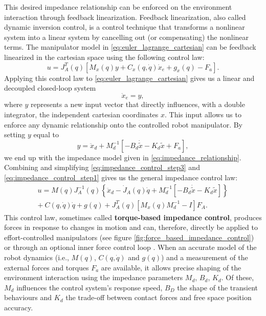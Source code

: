 This desired impedance relationship can be enforced on the environment interaction through feedback linearization. Feedback linearization, also called dynamic inversion control, is a control technique that transforms a nonlinear system into a linear system by cancelling out (or compensating) the nonlinear terms. The manipulator model in \eqref{eq:euler_lagrange_cartesian} can be feedback linearized in the cartesian space using the following control law:
\begin{equation} \label{eq:impedance_control_step1}
  u = J_ A^T \left( q \right)\left[ M_x \left( q \right) y + C_x \left( q ,\dot{ q }\right)\dot{ x }_e + g_x \left( q \right)- F_a \right].
\end{equation}
Applying this control law to \eqref{eq:euler_lagrange_cartesian} gives us a linear and decoupled closed-loop system
\begin{equation} \label{eq:impedance_control_step2}
  \ddot{ x }_e = y,
\end{equation}
where $y$ represents a new input vector that directly influences, with a double integrator, the independent cartesian coordinates $x$. This input allows us to enforce any dynamic relationship onto the controlled robot manipulator. By setting $y$ equal to
\begin{equation} \label{eq:impedance_control_step3}
  y = \ddot{ x }_d + M_ d^{- 1 }\left[- B_d \dot{\widetilde{ x }}- K_d \widetilde{ x }+ F_a \right],
\end{equation}
we end up with the impedance model given in \eqref{eq:impedance_relationship}. Combining and simplifying \eqref{eq:impedance_control_step3} and \eqref{eq:impedance_control_step1} gives us the general impedance control law:
\begin{equation}
  \begin{split}
    u = M \left( q \right) J_ A^{- 1 }\left( q \right)\left\{\ddot{ x }_d - \dot{ J }_A \left( q \right)\dot{ q } +  M_ d^{- 1 }\left[- B_d \dot{\widetilde{ x }} - K_d \widetilde{ x }\right]\right\} \\
    +\ C \left( q ,\dot{ q }\right)\dot{ q } + g \left( q \right) + J_ A^T \left( q \right)\left[ M_x \left( q \right) M_ d^{- 1 }- I \right] F_A.
  \end{split}
\end{equation}
This control law, sometimes called \textbf{torque-based impedance control}, produces forces in response to changes in motion and can, therefore, directly be applied to effort-controlled manipulators (see figure \ref{fig:force_based_impedance_control}) or through an optional inner force control loop \cite{al-shukaActiveImpedanceControl2018}. When an accurate model of the robot dynamics (i.e., $M \left( q \right)$, $C \left( q, \dot{ q }\right)$ and $g \left( q \right)$) and a measurement of the external forces and torques $F_a$ are available, it allows precise shaping of the environment interaction using the impedance parameters $M_d$, $B_d$, $K_d$. Of these, $M_d$ influences the control system's response speed, $B_D$ the shape of the transient behaviours and $K_d$ the trade-off between contact forces and free space position accuracy.

